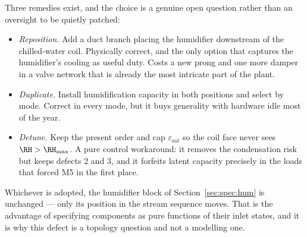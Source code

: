Three remedies exist, and the choice is a genuine open question rather than an oversight to be
quietly patched:
\begin{itemize}[nosep]
\item \emph{Reposition.} Add a duct branch placing the humidifier downstream of the chilled-water
coil. Physically correct, and the only option that captures the humidifier's cooling as useful duty.
Costs a new prong and one more damper in a valve network that is already the most intricate part of
the plant.
\item \emph{Duplicate.} Install humidification capacity in both positions and select by mode. Correct
in every mode, but it buys generality with hardware idle most of the year.
\item \emph{Detune.} Keep the present order and cap $\varepsilon_{\mathrm{sat}}$ so the coil face
never sees $\RH>\RH_{\max}$. A pure control workaround: it removes the condensation risk but keeps
defects 2 and 3, and it forfeits latent capacity precisely in the loads that forced M5 in the first
place.
\end{itemize}
Whichever is adopted, the humidifier block of Section~\ref{sec:spec:hum} is unchanged --- only its
position in the stream sequence moves. That is the advantage of specifying components as pure
functions of their inlet states, and it is why this defect is a topology question and not a modelling
one.

